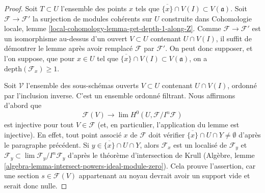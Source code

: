 \begin{proof}
Soit $T \subset U$ l'ensemble des points $x$ tels que
$\overline{\{x\}} \cap V(I) \subset V(\mathfrak a)$.
Soit $\mathcal{F} \to \mathcal{F}'$ la surjection
de modules cohérents sur $U$ construite dans
Cohomologie locale, lemme \ref{local-cohomology-lemma-get-depth-1-along-Z}.
Comme $\mathcal{F} \to \mathcal{F}'$ est un isomorphisme
au-dessus d'un ouvert $V \subset U$ contenant $U \cap V(I)$,
il suffit de démontrer le lemme après avoir remplacé $\mathcal{F}$
par $\mathcal{F}'$. On peut donc supposer, et l'on suppose, que
pour $x \in U$ tel que $\overline{\{x\}} \cap V(I) \subset V(\mathfrak a)$,
on a $\text{depth}(\mathcal{F}_x) \geq 1$.

\medskip\noindent
Soit $\mathcal{V}$ l'ensemble des sous-schémas ouverts $V \subset U$
contenant $U \cap V(I)$, ordonné par l'inclusion inverse.
C'est un ensemble ordonné filtrant. Nous affirmons d'abord que
$$
\mathcal{F}(V)
\longrightarrow
\lim H^0(U, \mathcal{F}/I^n\mathcal{F})
$$
est injective pour tout $V \in \mathcal{F}$ (et, en particulier, l'application
du lemme est injective). En effet, tout point associé $x$ de $\mathcal{F}$
doit vérifier $\overline{\{x\}} \cap U \cap Y \not = \emptyset$
d'après le paragraphe précédent. Si $y \in \overline{\{x\}} \cap U \cap Y$, alors
$\mathcal{F}_x$ est un localisé de $\mathcal{F}_y$
et $\mathcal{F}_y \subset \lim \mathcal{F}_y/I^n \mathcal{F}_y$
d'après le théorème d'intersection de Krull
(Algèbre, lemme \ref{algebra-lemma-intersect-powers-ideal-module-zero}).
Cela prouve l'assertion, car une section $s \in \mathcal{F}(V)$
appartenant au noyau devrait avoir un support vide et serait donc nulle.


\end{proof}
